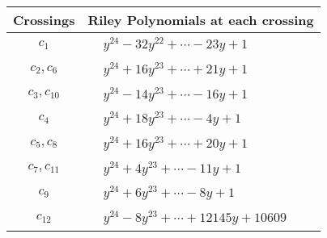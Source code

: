 \documentclass[1p]{elsarticle_modified}
\theoremstyle{definition}
\begin{document}
\begin{tabular}{m{50pt}|m{274pt}}
Crossings & \hspace{64pt}Riley Polynomials at each crossing \\
\hline $$\begin{aligned}c_{1}\end{aligned}$$&$\begin{aligned}
&y^{24}-32 y^{22}+\cdots-23 y+1
\end{aligned}$\\
\hline $$\begin{aligned}c_{2},c_{6}\end{aligned}$$&$\begin{aligned}
&y^{24}+16 y^{23}+\cdots+21 y+1
\end{aligned}$\\
\hline $$\begin{aligned}c_{3},c_{10}\end{aligned}$$&$\begin{aligned}
&y^{24}-14 y^{23}+\cdots-16 y+1
\end{aligned}$\\
\hline $$\begin{aligned}c_{4}\end{aligned}$$&$\begin{aligned}
&y^{24}+18 y^{23}+\cdots-4 y+1
\end{aligned}$\\
\hline $$\begin{aligned}c_{5},c_{8}\end{aligned}$$&$\begin{aligned}
&y^{24}+16 y^{23}+\cdots+20 y+1
\end{aligned}$\\
\hline $$\begin{aligned}c_{7},c_{11}\end{aligned}$$&$\begin{aligned}
&y^{24}+4 y^{23}+\cdots-11 y+1
\end{aligned}$\\
\hline $$\begin{aligned}c_{9}\end{aligned}$$&$\begin{aligned}
&y^{24}+6 y^{23}+\cdots-8 y+1
\end{aligned}$\\
\hline $$\begin{aligned}c_{12}\end{aligned}$$&$\begin{aligned}
&y^{24}-8 y^{23}+\cdots+12145 y+10609
\end{aligned}$\\
\hline
\end{tabular}\\~\\
\end{document}
